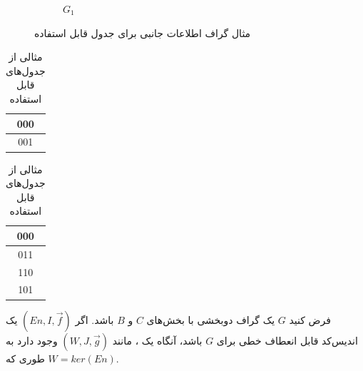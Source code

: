 \begin{example}
\begin{figure}[H]
\begin{subfigure}[b]{0.3\textwidth}
    \caption{$G_1$}
       \label{figure:example:shit}
            \end{subfigure}
                    \caption{مثال گراف اطلاعات جانبی برای جدول قابل استفاده}
            \label{fig:three graphs}
       	\end{figure}
       	
       	\begin{table}[H]
       		    \begin{subtable}[h]{0.45\textwidth}
       			\centering
	        		\begin{tabular}{|c|}
	        			\hline
	        			000 \\
	        			\hline
	        			001 \\
	        			\hline
	        		\end{tabular}
	        		\caption{$T_1$}
	        		\end{subtable}
	        		       		    \begin{subtable}[h]{0.45\textwidth}
	        			\centering
	 		       		\begin{tabular}{|c|}
	 		       			\hline
	 		       			000  \\
	 		       			\hline
	 		       			011   \\
	 		       			\hline
	 		       			110  \\
	 		       			\hline
	 		       			101   \\
	 		       			\hline
	 		       		\end{tabular}
	 		       	\caption{$T_2$}
       	       \label{figure:example:shittable}
       	       	        		\end{subtable}
       	       	        		\caption{مثالی از جدول‌های قابل استفاده}
      	\end{table}
\end{example}

\begin{lemma}
    فرض کنید 
    $G$ 
    یک گراف دوبخشی با بخش‌های
    $C$
    و
    $B$
     باشد. اگر 
    $(En, I, \overrightarrow{f})$
    یک اندیس‌کد قابل انعطاف خطی برای 
    $G$
     باشد، آنگاه یک 
     \lpsicod،
     مانند
      $(W, J, \overrightarrow{g})$
     وجود دارد به طوری که 
     $W  = ker(En)$.
\end{lemma}

